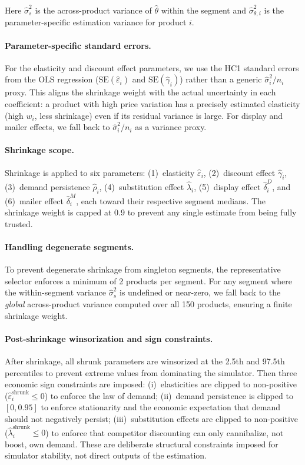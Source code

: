\documentclass[12pt,a4paper]{article}
\begin{document}
Here $\hat{\sigma}_{s}^2$ is the across-product variance of
$\hat{\theta}$ within the segment and $\hat{\sigma}_{\theta,i}^2$
is the parameter-specific estimation variance for product $i$.

\paragraph{Parameter-specific standard errors.}
For the elasticity and discount effect parameters, we use the HC1
standard errors from the OLS regression ($\text{SE}(\hat{\varepsilon}_i)$
and $\text{SE}(\hat{\gamma}_i)$) rather than a generic
$\hat{\sigma}_i^2 / n_i$ proxy. This aligns the shrinkage weight with
the actual uncertainty in each coefficient: a product with high price
variation has a precisely estimated elasticity (high $w_i$, less
shrinkage) even if its residual variance is large. For display and
mailer effects, we fall back to $\hat{\sigma}_i^2 / n_i$ as a
variance proxy.

\paragraph{Shrinkage scope.}
Shrinkage is applied to six parameters: (1)~elasticity
$\hat{\varepsilon}_i$, (2)~discount effect $\hat{\gamma}_i$,
(3)~demand persistence $\hat{\rho}_i$,
(4)~substitution effect $\hat{\lambda}_i$,
(5)~display effect $\hat{\delta}_i^D$, and (6)~mailer effect
$\hat{\delta}_i^M$, each toward their respective segment medians.
The shrinkage weight is capped at 0.9 to prevent any single estimate
from being fully trusted.

\paragraph{Handling degenerate segments.}
To prevent degenerate shrinkage from singleton segments, the
representative selector enforces a minimum of 2 products per
segment. For any segment where the within-segment
variance $\hat{\sigma}_s^2$ is undefined or near-zero, we fall
back to the \emph{global} across-product variance computed over all
150 products, ensuring a finite shrinkage weight.

\paragraph{Post-shrinkage winsorization and sign constraints.}
After shrinkage, all shrunk parameters are winsorized at the 2.5th
and 97.5th percentiles to prevent extreme values from dominating the
simulator. Then three economic sign constraints are imposed:
(i)~elasticities are clipped to non-positive
($\hat{\varepsilon}_i^{\text{shrunk}} \leq 0$) to enforce the
law of demand; (ii)~demand persistence is clipped to $[0, 0.95]$
to enforce stationarity and the economic expectation that demand
should not negatively persist; (iii)~substitution effects are
clipped to non-positive ($\hat{\lambda}_i^{\text{shrunk}} \leq 0$)
to enforce that competitor discounting can only cannibalize, not
boost, own demand. These are deliberate structural constraints
imposed for simulator stability, not direct outputs of the
estimation.
\end{document}
